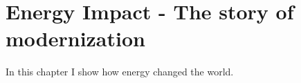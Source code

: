 \setchapterpreamble[u]{\margintoc}
\chapter{Energy Impact - The story of modernization}

In this chapter I show how energy changed the world.